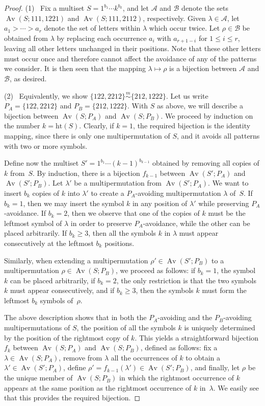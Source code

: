 \documentclass[11pt]{amsart}
\theoremstyle{plain}
\theoremstyle{definition}
\newcommand{\msim}{\stackrel{m}{\sim}}
\newcommand{\he}{\text{ht}}
\DeclareMathOperator{\Av}{Av}
\begin{document}
\begin{proof}
(1) \, Fix a multiset $S=1^{b_1}\cdots k^{b_k}$, and let $\mathcal{A}$ and $\mathcal{B}$ denote the
sets $\Av(S;111,1221)$ and $\Av(S;111,2112)$, respectively. Given $\lambda \in
\mathcal{A}$, let $a_1>\cdots>a_r$ denote the set of letters within $\lambda$ which occur twice.  Let
$\rho \in \mathcal{B}$ be obtained from $\lambda$ by replacing each occurrence $a_i$ with
$a_{r+1-i}$ for $1 \leq i \leq r$, leaving all other letters unchanged in their positions.  Note that
these other letters must occur once and therefore cannot affect the avoidance of any of the
patterns we consider. It is then seen that the mapping $\lambda \mapsto \rho$ is a bijection between
$\mathcal{A}$ and $\mathcal{B}$, as desired.

(2) \, Equivalently, we show $\{122,2212\}\msim\{212,1222\}$. Let us write $P_A=\{122,2212\}$ and
$P_B=\{212,1222\}$. With $S$ as above, we will describe a bijection between $\Av(S;P_A)$
and $\Av(S;P_B)$. We proceed by induction on the number $k=\he(S)$. Clearly, if $k=1$,
the required bijection is the identity mapping, since there is only one multipermutation of $S$, and
it avoids all patterns with two or more symbols.

Define now the multiset $S'=1^{b_1}\cdots (k-1)^{b_{k-1}}$ obtained by removing all copies of $k$
from~$S$. By induction, there is a bijection $f_{k-1}$ between $\Av(S';P_A)$ and $\Av(S';P_B)$. Let
$\lambda'$ be a multipermutation from $\Av(S';P_A)$. We want to insert $b_k$ copies of $k$ into
$\lambda'$ to create a $P_A$-avoiding multipermutation $\lambda$ of~$S$. If $b_k=1$, then we may
insert the symbol $k$ in any position of $\lambda'$ while preserving $P_A$-avoidance. If $b_k=2$,
then we observe that one of the copies of $k$ must be the leftmost symbol of $\lambda$ in order
to preserve $P_A$-avoidance, while the other can be placed arbitrarily. If $b_k\ge 3$, then all the
symbols $k$ in $\lambda$ must appear consecutively at the leftmost $b_k$ positions.

Similarly, when extending a multipermutation $\rho'\in\Av(S';P_B)$ to a multipermutation
$\rho\in\Av(S;P_B)$, we proceed as follows: if $b_k=1$, the symbol $k$ can be placed arbitrarily, if
$b_k=2$, the only restriction is that the two symbols $k$ must appear consecutively, and if $b_k\ge
3$, then the symbols $k$ must form the leftmost $b_k$ symbols of~$\rho$.

The above description shows that in both the $P_A$-avoiding and the $P_B$-avoiding multipermutations
of $S$, the position of all the symbols $k$ is uniquely determined by the position of the rightmost
copy of $k$. This yields a straightforward bijection $f_k$ between $\Av(S;P_A)$ and $\Av(S;P_B)$,
defined as follows: fix a $\lambda\in\Av(S;P_A)$, remove from $\lambda$ all the occurrences of $k$ to
obtain a $\lambda'\in \Av(S';P_A)$, define $\rho'=f_{k-1}(\lambda')\in\Av(S';P_B)$, and finally, let
$\rho$ be the unique member of $\Av(S;P_B)$ in which the rightmost occurrence of $k$ appears at the
same position as the rightmost occurrence of $k$ in~$\lambda$. We easily see that this provides the
required bijection.
\end{proof}
\end{document}
